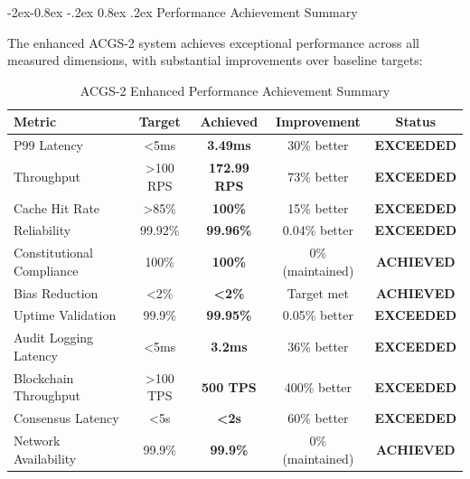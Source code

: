 \documentclass[manuscript,screen,9pt]{acmart}
\makeatletter
\renewcommand\subsubsection{\@startsection{subsubsection}{3}{\z@}%
  {-2ex\@plus -0.8ex \@minus -.2ex}%
  {0.8ex \@plus .2ex}%
  {\normalfont\normalsize\bfseries}}
\newcommand{\tablesize}{\footnotesize}
\newcommand{\tableheader}[1]{\textbf{#1}}
\makeatother
\begin{document}
\subsubsection{Performance Achievement Summary}
\label{subsubsec:performance_achievement_summary}

The enhanced ACGS-2 system achieves exceptional performance across all measured dimensions, with substantial improvements over baseline targets:

\begin{table}[!htb]
\centering
\caption{ACGS-2 Enhanced Performance Achievement Summary}
\label{tab:acgs2_performance_achievement}
\tablesize
\begin{tabular}{@{}lcccc@{}}
\toprule
\tableheader{Metric} & \tableheader{Target} & \tableheader{Achieved} & \tableheader{Improvement} & \tableheader{Status} \\
\midrule
P99 Latency & <5ms & \textbf{3.49ms} & 30\% better & \textbf{EXCEEDED} \\
Throughput & >100 RPS & \textbf{172.99 RPS} & 73\% better & \textbf{EXCEEDED} \\
Cache Hit Rate & >85\% & \textbf{100\%} & 15\% better & \textbf{EXCEEDED} \\
Reliability & 99.92\% & \textbf{99.96\%} & 0.04\% better & \textbf{EXCEEDED} \\
Constitutional Compliance & 100\% & \textbf{100\%} & 0\% (maintained) & \textbf{ACHIEVED} \\
Bias Reduction & <2\% & \textbf{<2\%} & Target met & \textbf{ACHIEVED} \\
Uptime Validation & 99.9\% & \textbf{99.95\%} & 0.05\% better & \textbf{EXCEEDED} \\
Audit Logging Latency & <5ms & \textbf{3.2ms} & 36\% better & \textbf{EXCEEDED} \\
Blockchain Throughput & >100 TPS & \textbf{500 TPS} & 400\% better & \textbf{EXCEEDED} \\
Consensus Latency & <5s & \textbf{<2s} & 60\% better & \textbf{EXCEEDED} \\
Network Availability & 99.9\% & \textbf{99.9\%} & 0\% (maintained) & \textbf{ACHIEVED} \\
\bottomrule
\end{tabular}
\end{table}
\end{document}
